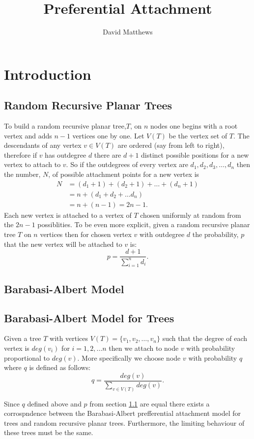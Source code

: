 \documentclass[12pt]{article} %
\title{Preferential Attachment}
\author{David Matthews}
\theoremstyle{definition}
\begin{document}
 
 \section{Introduction}
 \subsection{Random Recursive Planar Trees}\label{RRPT}
 
 To build a random recursive planar tree,$T$, on $n$ nodes one begins with a root vertex and adds $n-1$ vertices one by one.  Let $V(T)$ be the vertex set of $T$. The descendants of any vertex $v \in V(T)$ are ordered (say from left to right), therefore if $v$ has outdegree $d$ there are $d+1$ distinct possible positions for a new vertex to attach to $v$.  So if the outdegrees of every vertex are $d_{1},d_{2},d_{3},\dots,d_{n}$ then the number, $N$, of possible attachment points for a new vertex is
 \begin{align*}
  N &= (d_{1} +1) + (d_{2} + 1) + \dots + (d_{n} + 1)\\
   &= n + (d_{1} + d_{2} + \dots d_{n}) \\
  &= n + (n-1) = 2n -1.
 \end{align*}
 Each new vertex is attached to a vertex of $T$ chosen uniformly at random from the $2n -1 $ possiblities.  To be even more explicit, given a random recursive planar tree $T$ on $n$ vertices then for chosen vertex $v$ with outdegree $d$ the probability, $p$ that the new vertex will be attached to $v$ is:
 \[p = \frac{d+1}{\sum_{i=1}^{n}d_{i}}.\] 
 
 \subsection{Barabasi-Albert Model}
 \subsection{Barabasi-Albert Model for Trees}
 
 Given a tree $T$ with vertices $V(T) = \{v_{1},v_{2},\dots,v_{n}\}$ such that the degree of each vertex is $deg(v_{i})$ for $i = 1,2,\dots n$ then we attach to node $v$ with probability proportional to $deg(v)$.  More specifically we choose node $v$ with probability $q$ where $q$ is defined as follows:
 \[q = \frac{deg(v)}{\sum_{v \in V(T)}deg(v)}.\]
 
 Since $q$ defined above and $p$ from section \ref{RRPT} are equal there exists a corrospndence between the Barabasi-Albert prefferential attachment model for trees and random recursive planar trees.  Furthermore, the limiting behaviour of these trees must be the same.  
 
\end{document}
